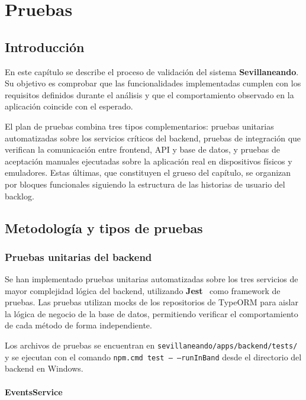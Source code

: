 \chapter{Pruebas}\label{cap:pruebas}

\section{Introducción}

En este capítulo se describe el proceso de validación del sistema \textbf{Sevillaneando}. Su objetivo es comprobar que las funcionalidades implementadas cumplen con los requisitos definidos durante el análisis y que el comportamiento observado en la aplicación coincide con el esperado.

El plan de pruebas combina tres tipos complementarios: pruebas unitarias automatizadas sobre los servicios críticos del backend, pruebas de integración que verifican la comunicación entre frontend, API y base de datos, y pruebas de aceptación manuales ejecutadas sobre la aplicación real en dispositivos físicos y emuladores. Estas últimas, que constituyen el grueso del capítulo, se organizan por bloques funcionales siguiendo la estructura de las historias de usuario del backlog.

\section{Metodología y tipos de pruebas}

\subsection{Pruebas unitarias del backend}

Se han implementado pruebas unitarias automatizadas sobre los tres servicios de mayor complejidad lógica del backend, utilizando \textbf{Jest}~\cite{jest} como framework de pruebas. Las pruebas utilizan mocks de los repositorios de TypeORM para aislar la lógica de negocio de la base de datos, permitiendo verificar el comportamiento de cada método de forma independiente.

Los archivos de pruebas se encuentran en \texttt{sevillaneando/apps/backend/tests/} y se ejecutan con el comando \texttt{npm.cmd test -- --runInBand} desde el directorio del backend en Windows.

\subsubsection{EventsService}

